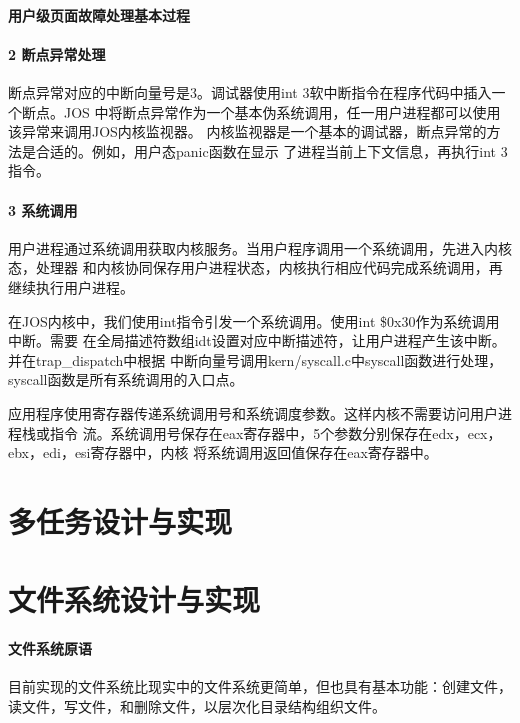 \documentclass[12pt,openany,a4paper]{report}
\begin{document}
	\paragraph{用户级页面故障处理基本过程}
	    
	\paragraph{2 断点异常处理}
	    断点异常对应的中断向量号是3。调试器使用int 3软中断指令在程序代码中插入一个断点。JOS
	中将断点异常作为一个基本伪系统调用，任一用户进程都可以使用该异常来调用JOS内核监视器。
	内核监视器是一个基本的调试器，断点异常的方法是合适的。例如，用户态panic函数在显示
	了进程当前上下文信息，再执行int 3指令。\par
	\paragraph{3 系统调用}
	    用户进程通过系统调用获取内核服务。当用户程序调用一个系统调用，先进入内核态，处理器
	和内核协同保存用户进程状态，内核执行相应代码完成系统调用，再继续执行用户进程。\par
	    在JOS内核中，我们使用int指令引发一个系统调用。使用int \$0x30作为系统调用中断。需要
	在全局描述符数组idt设置对应中断描述符，让用户进程产生该中断。并在trap\_dispatch中根据
	中断向量号调用kern/syscall.c中syscall函数进行处理，syscall函数是所有系统调用的入口点。\par	
	    应用程序使用寄存器传递系统调用号和系统调度参数。这样内核不需要访问用户进程栈或指令
	流。系统调用号保存在eax寄存器中，5个参数分别保存在edx，ecx，ebx，edi，esi寄存器中，内核
	将系统调用返回值保存在eax寄存器中。\par

	\section{多任务设计与实现}

	\section{文件系统设计与实现}

	\paragraph{文件系统原语}
	   目前实现的文件系统比现实中的文件系统更简单，但也具有基本功能：创建文件，
	读文件，写文件，和删除文件，以层次化目录结构组织文件。\par
\end{document}
